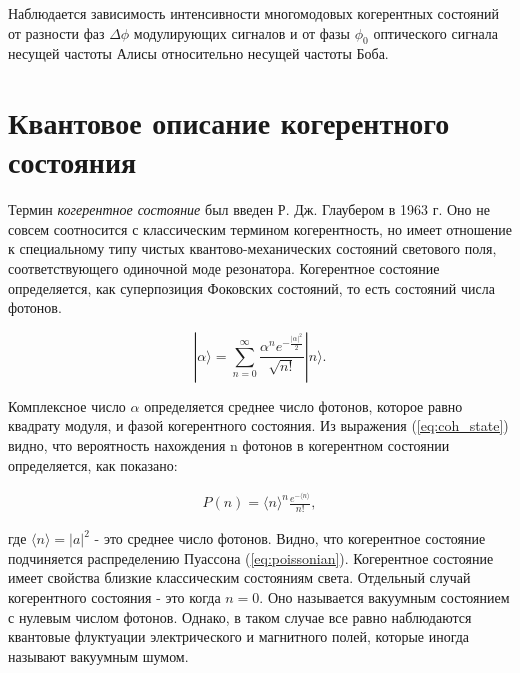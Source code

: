 Наблюдается зависимость интенсивности многомодовых когерентных состояний от разности фаз $\Delta\phi$ модулирующих сигналов и от фазы $\phi_0$ оптического сигнала несущей частоты Алисы относительно несущей частоты Боба.

\section{Квантовое описание когерентного состояния} \label{sec:ch4/sec3}
Термин \textit{когерентное состояние} был введен Р. Дж. Глаубером в 1963 г. Оно не совсем соотносится с классическим термином когерентность, но имеет отношение к специальному типу чистых квантово-механических состояний светового поля, соответствующего одиночной моде резонатора. Когерентное состояние определяется, как суперпозиция Фоковских состояний, то есть состояний числа фотонов. 


\begin{equation}
    |\alpha \rangle = \sum_{n=0}^{\infty}  \frac{\alpha^n e^{-\frac{|\alpha|^2}{2}}}{\sqrt{n!}} |n\rangle.
\label{eq:coh_state}
\end{equation}

Комплексное число $ \alpha $	определяется среднее число фотонов, которое равно квадрату модуля, и фазой когерентного состояния. Из выражения (\ref{eq:coh_state}) видно, что вероятность нахождения n фотонов в когерентном состоянии определяется, как показано: 

\begin{equation}
	\begin{aligned}
		P (n) =  \langle n \rangle^n \frac{e^{- \langle n \rangle}}{{n!}} ,
	\end{aligned}
	\label{eq:poissonian}
\end{equation}

где $\langle n \rangle = |a|^2$ - это среднее число фотонов. Видно, что когерентное состояние подчиняется распределению Пуассона (\ref{eq:poissonian}). Когерентное состояние имеет свойства близкие классическим состояниям света. Отдельный случай когерентного состояния - это когда $n = 0$. Оно называется вакуумным состоянием с нулевым числом фотонов. Однако, в таком случае все равно наблюдаются квантовые флуктуации электрического и магнитного полей, которые иногда называют вакуумным шумом. 




